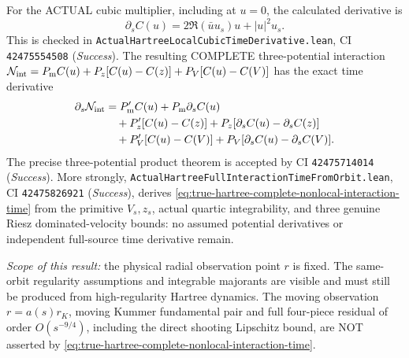 \documentclass[11pt]{amsart}
\begin{document}
For the ACTUAL cubic multiplier, including at \(u=0\), the
calculated derivative is
\[
 \partial_s C(u)
 =2\Re(\bar u u_s)u+|u|^2u_s .
\]
This is checked in
\texttt{ActualHartreeLocalCubicTimeDerivative.lean},
CI \texttt{42475554508} (\emph{Success}).
The resulting COMPLETE three-potential interaction
\(
 \mathcal N_{\rm int}
 =P_{\rm m}C(u)
 +P_z[C(u)-C(z)]
 +P_V[C(u)-C(V)]
\)
has the exact time derivative
\begin{align}
 \partial_s\mathcal N_{\rm int}
 &=P_{\rm m}'C(u)+P_{\rm m}\partial_s C(u)\notag\\
 &\quad+P_z'[C(u)-C(z)]
       +P_z[\partial_sC(u)-\partial_sC(z)]\notag\\
 &\quad+P_V'[C(u)-C(V)]
       +P_V[\partial_sC(u)-\partial_sC(V)].
 \label{eq:true-hartree-complete-nonlocal-interaction-time}
\end{align}
The precise three-potential product theorem is accepted by
CI \texttt{42475714014} (\emph{Success}). More strongly,
\texttt{ActualHartreeFullInteractionTimeFromOrbit.lean},
CI \texttt{42475826921} (\emph{Success}), derives
\eqref{eq:true-hartree-complete-nonlocal-interaction-time}
from the primitive \(V_s,z_s\), actual quartic integrability,
and three genuine Riesz dominated-velocity bounds:
no assumed potential derivatives or independent full-source
time derivative remain.

\emph{Scope of this result:} the physical radial observation
point \(r\) is fixed. The same-orbit regularity assumptions and
integrable majorants are visible and must still be produced from
high-regularity Hartree dynamics. The moving observation
\(r=a(s)r_K\), moving Kummer fundamental pair and full four-piece
residual of order \(O(s^{-9/4})\), including the direct shooting
Lipschitz bound, are NOT asserted by
\eqref{eq:true-hartree-complete-nonlocal-interaction-time}.
\end{document}
